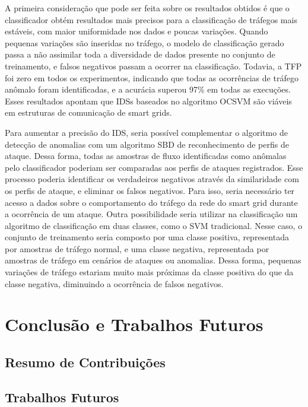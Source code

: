 \documentclass[cic,tc]{iiufrgs}
\begin{document}
A primeira consideração que pode ser feita sobre os resultados obtidos é que o classificador obtém resultados mais precisos para a classificação de tráfegos mais estáveis, com maior uniformidade nos dados e poucas variações. Quando pequenas variações são inseridas no tráfego, o modelo de classificação gerado passa a não assimilar toda a diversidade de dados presente no conjunto de treinamento, e falsos negativos passam a ocorrer na classificação. Todavia, a TFP foi zero em todos os experimentos, indicando que todas as ocorrências de tráfego anômalo foram identificadas, e a acurácia superou 97\% em todas as execuções. Esses resultados apontam que IDSs baseados no algoritmo OCSVM são viáveis em estruturas de comunicação de smart grids.

Para aumentar a precisão do IDS, seria possível complementar o algoritmo de detecção de anomalias com um algoritmo SBD de reconhecimento de perfis de ataque. Dessa forma, todas as amostras de fluxo identificadas como anômalas pelo classificador poderiam ser comparadas aos perfis de ataques registrados. Esse processo poderia identificar os verdadeiros negativos através da similaridade com os perfis de ataque, e eliminar os falsos negativos. Para isso, seria necessário ter acesso a dados sobre o comportamento do tráfego da rede do smart grid durante a ocorrência de um ataque. Outra possibilidade seria utilizar na classificação um algoritmo de classificação em duas classes, como o SVM tradicional. Nesse caso, o conjunto de treinamento seria composto por uma classe positiva, representada por amostras de tráfego normal, e uma classe negativa, representada por amostras de tráfego em cenários de ataques ou anomalias. Dessa forma, pequenas variações de tráfego estariam muito mais próximas da classe positiva do que da classe negativa, diminuindo a ocorrência de falsos negativos.

\chapter{Conclusão e Trabalhos Futuros}
\section{Resumo de Contribuições}
\section{Trabalhos Futuros}

% 



\end{document}
